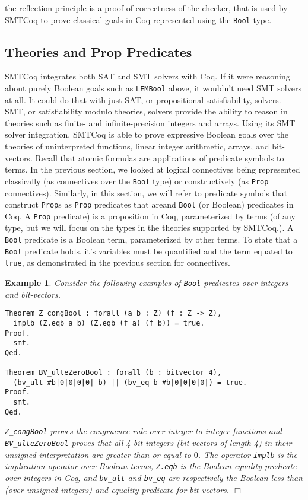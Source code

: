\documentclass[11pt]{article}
\newtheorem{example}{Example}[section]
\begin{document}
	the reflection principle is a proof
	of correctness of the checker, that 
	is used by SMTCoq to prove classical
	goals in Coq represented using the
	\texttt{Bool} type.
	
	\subsection{Theories and Prop Predicates}
	SMTCoq integrates both 
	SAT and SMT solvers with Coq. If 
	it were reasoning about purely 
	Boolean goals such as 
	\texttt{LEMBool} above, it wouldn't 
	need SMT solvers at all. It could
	do that with just SAT, or
	propositional satisfiability,
	solvers. SMT, or satisfiability
	modulo theories, solvers provide 
	the ability to reason in theories
	such as finite- and infinite-precision 
	integers and arrays. Using its SMT 
	solver integration, SMTCoq is able to 
	prove expressive Boolean goals
	over the theories of uninterpreted 
	functions, linear integer arithmetic,
	arrays, and bit-vectors. Recall that
	atomic formulas are applications of  
	predicate symbols to
	terms. In the previous section, 
	we looked at logical connectives 
	being represented classically (as 
	connectives over the \texttt{Bool}
	type) or constructively (as 
	\texttt{Prop} connectives). Similarly,
	in this section, we will refer to
	predicate symbols that construct 
	\texttt{Prop}s as
	\texttt{Prop} predicates that areand 
	\texttt{Bool} (or Boolean) predicates 
	in Coq. A \texttt{Prop} predicate)
	is a proposition in Coq, parameterized
	by terms (of any type, but we will 
	focus on the types in the theories 
	supported by SMTCoq.). A \texttt{Bool}
	predicate is a Boolean term,
	parameterized by other terms. To
	state that a \texttt{Bool} predicate 
	holds, it's variables must be 
	quantified and the term equated to 
	\texttt{true}, as demonstrated 
	in the previous section for connectives.
	
	\begin{example}
		\em Consider the following examples
		of \texttt{Bool} predicates 
		over integers and bit-vectors.
		\begin{verbatim}
Theorem Z_congBool : forall (a b : Z) (f : Z -> Z), 
  implb (Z.eqb a b) (Z.eqb (f a) (f b)) = true.
Proof.
  smt.
Qed.

Theorem BV_ulteZeroBool : forall (b : bitvector 4),
  (bv_ult #b|0|0|0|0| b) || (bv_eq b #b|0|0|0|0|) = true.
Proof.
  smt.
Qed.

		\end{verbatim}
		\texttt{Z\_congBool} proves the 
		congruence rule over integer 
		to integer functions and 
		\texttt{BV\_ulteZeroBool} proves 
		that all 4-bit integers (bit-vectors 
		of length 4) in their 
		unsigned interpretation are 
		greater than or equal to $0$. The
		operator
		\texttt{implb} is the implication 
		operator over Boolean terms, 
		\texttt{Z.eqb} is the Boolean 
		equality predicate over integers 
		in Coq, and \texttt{bv\_ult}
		and \texttt{bv\_eq} are 
		respectively the Boolean 
		less than (over unsigned integers)
		and equality predicate for 
		bit-vectors. \hfill$\Box$
	\end{example}
\end{document}
